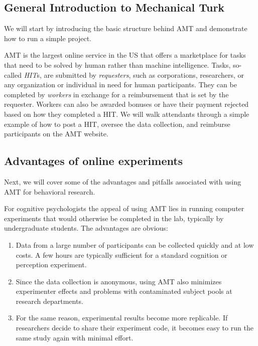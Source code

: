 \documentclass[10pt,letterpaper]{article}
\begin{document}
\subsection{General Introduction to Mechanical Turk}
We will start by introducing the basic structure behind AMT and demonstrate how to run a simple project.

AMT is the largest online service in the US that offers a marketplace for tasks that need to be solved by human rather than machine intelligence. Tasks, so-called \emph{HIT}s, are submitted by \emph{requesters}, such as corporations, researchers, or any organization or individual in need for human participants. 
They can be completed by \emph{workers} in exchange for a reimbursement that is set by the requester. 
Workers can also be awarded bonuses or have their payment rejected based on how they completed a HIT.
We will walk attendants through a simple example of how to post a HIT, oversee the data collection, and reimburse participants on the AMT website.


\subsection{Advantages of online experiments}
Next, we will cover some of the advantages and pitfalls associated with using AMT for behavioral research.

For cognitive psychologists the appeal of using AMT lies in running computer experiments that would otherwise be completed in the lab, typically by undergraduate students. 
The advantages are obvious: 
\begin{enumerate}
\item
Data from a large number of participants can be collected  quickly and at low costs. A few hours are typically sufficient for a standard cognition or perception experiment. 
\item
Since the data collection is anonymous, using AMT also minimizes experimenter effects and problems with contaminated subject pools at research departments. 
\item For the same reason, experimental results become more replicable. If researchers decide to share their experiment code, it becomes easy to run the same study again with minimal effort.
\end{enumerate}
\end{document}
